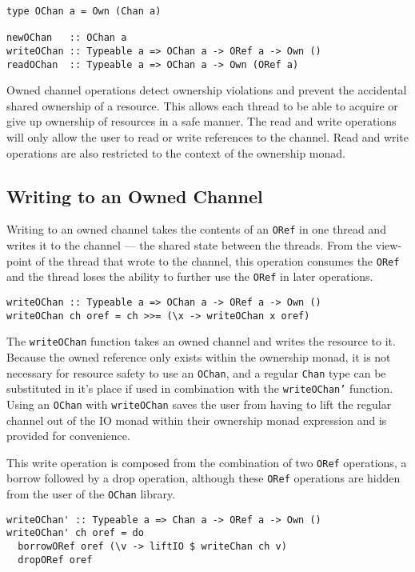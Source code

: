 \documentclass[onehalf,11pt]{beavtex}
\begin{document}
\begin{verbatim}
type OChan a = Own (Chan a)

newOChan   :: OChan a
writeOChan :: Typeable a => OChan a -> ORef a -> Own ()
readOChan  :: Typeable a => OChan a -> Own (ORef a)
\end{verbatim}

Owned channel operations detect ownership violations and prevent the
accidental shared ownership of a resource.
This allows each thread to be able to acquire or give up ownership of resources
in a safe manner.  The read and write operations will only allow the user to
read or write references to the channel.  Read and write operations are also
restricted to the context of the ownership monad.

\subsection{Writing to an Owned Channel}

Writing to an owned channel takes the contents of an \texttt{ORef} in
one thread and writes it to the channel --- the shared state between the threads.
From the view-point of the thread that wrote to the channel, this operation
consumes the \texttt{ORef} and the thread loses the ability to further use the
\texttt{ORef} in later operations.

\begin{verbatim}
writeOChan :: Typeable a => OChan a -> ORef a -> Own ()
writeOChan ch oref = ch >>= (\x -> writeOChan x oref)
\end{verbatim}

The \texttt{writeOChan} function takes an owned channel and writes the
resource to it. Because the owned reference only exists within the ownership
monad, it is not necessary for resource safety to use an \texttt{OChan}, and a
regular \texttt{Chan} type can be substituted in it's place if used in
combination with the \texttt{writeOChan'} function.
Using an \texttt{OChan} with \texttt{writeOChan} saves the user from having to
lift the regular channel out of the IO monad within their ownership monad
expression and is provided for convenience.

This write operation is composed from the combination of two
\texttt{ORef} operations, a borrow followed by a drop operation, 
although these \texttt{ORef} operations are hidden from the user of the
\texttt{OChan} library.

\begin{verbatim}
writeOChan' :: Typeable a => Chan a -> ORef a -> Own ()
writeOChan' ch oref = do
  borrowORef oref (\v -> liftIO $ writeChan ch v)
  dropORef oref
\end{verbatim}
\end{document}
